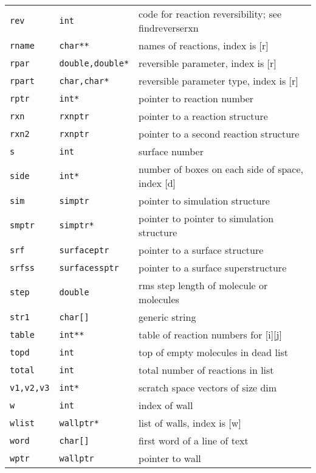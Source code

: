 \documentclass {book}
\begin{document}
\begin{longtable}[c]{lll}
\texttt{rev} & \texttt{int} & code for reaction reversibility; see findreverserxn\\
\texttt{rname} & \texttt{char**} & names of reactions, index is [r]\\
\texttt{rpar} & \texttt{double,double*} & reversible parameter, index is [r]\\
\texttt{rpart} & \texttt{char,char*} & reversible parameter type, index is [r]\\
\texttt{rptr} & \texttt{int*} & pointer to reaction number\\
\texttt{rxn} & \texttt{rxnptr} & pointer to a reaction structure\\
\texttt{rxn2} & \texttt{rxnptr} & pointer to a second reaction structure\\
\texttt{s} & \texttt{int} & surface number\\
\texttt{side} & \texttt{int*} & number of boxes on each side of space, index [d]\\
\texttt{sim} & \texttt{simptr} & pointer to simulation structure\\
\texttt{smptr} & \texttt{simptr*} & pointer to pointer to simulation structure\\
\texttt{srf} & \texttt{surfaceptr} & pointer to a surface structure\\
\texttt{srfss} & \texttt{surfacessptr} & pointer to a surface superstructure\\
\texttt{step} & \texttt{double} & rms step length of molecule or molecules\\
\texttt{str1} & \texttt{char[]} & generic string\\
\texttt{table} & \texttt{int**} & table of reaction numbers for [i][j]\\
\texttt{topd} & \texttt{int} & top of empty molecules in dead list\\
\texttt{total} & \texttt{int} & total number of reactions in list\\
\texttt{v1,v2,v3} & \texttt{int*} & scratch space vectors of size dim\\
\texttt{w} & \texttt{int} & index of wall\\
\texttt{wlist} & \texttt{wallptr*} & list of walls, index is [w]\\
\texttt{word} & \texttt{char[]} & first word of a line of text\\
\texttt{wptr} & \texttt{wallptr} & pointer to wall\\
\end{longtable}

\end{document}
